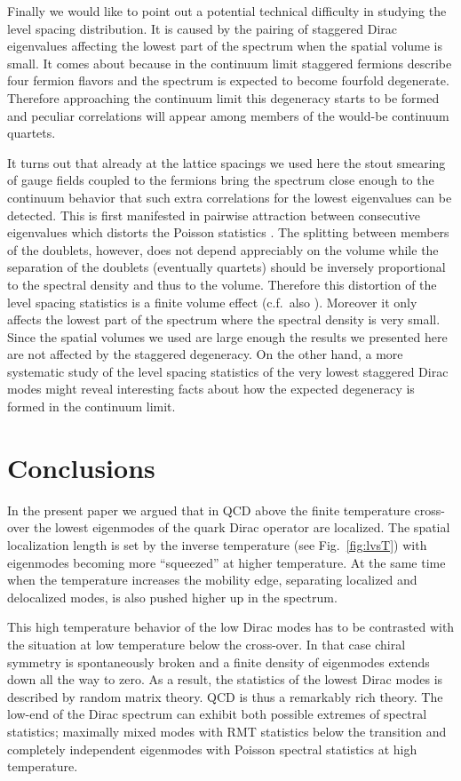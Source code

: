 \documentclass[twocolumn, prd, preprintnumbers, amsmath,
  amssymb, showpacs, floatfix]{revtex4-1}
\begin{document}
Finally we would like to point out a potential technical difficulty in
studying the level spacing distribution. It is caused by the pairing of
staggered Dirac eigenvalues affecting the lowest part of the spectrum when the
spatial volume is small. It comes about because in the continuum limit
staggered fermions describe four fermion flavors and the spectrum is expected
to become fourfold degenerate. Therefore approaching the continuum limit this
degeneracy starts to be formed and peculiar correlations will appear among
members of the would-be continuum quartets.

It turns out that already at the lattice spacings we used here the stout
smearing of gauge fields coupled to the fermions bring the spectrum close
enough to the continuum behavior that such extra correlations for the lowest
eigenvalues can be detected. This is first manifested in pairwise attraction
between consecutive eigenvalues which distorts the Poisson statistics
\cite{Kovacs:2011km}.  The splitting between members of the doublets, however,
does not depend appreciably on the volume while the separation of the doublets
(eventually quartets) should be inversely proportional to the spectral density
and thus to the volume. Therefore this distortion of the level spacing
statistics is a finite volume effect (c.f.\ also
\cite{Halasz:1996sb}). Moreover it only affects the lowest part of the
spectrum where the spectral density is very small. Since the spatial volumes
we used are large enough the results we presented here are not affected by the
staggered degeneracy. On the other hand, a more systematic study of the level
spacing statistics of the very lowest staggered Dirac modes might reveal
interesting facts about how the expected degeneracy is formed in the continuum
limit.


\section{Conclusions}
   \label{se:C}

In the present paper we argued that in QCD above the finite temperature
cross-over the lowest eigenmodes of the quark Dirac operator are
localized. The spatial localization length is set by the inverse temperature
(see Fig.~\ref{fig:lvsT}) with eigenmodes becoming more ``squeezed'' at
higher temperature. At the same time when the temperature increases the
mobility edge, separating localized and delocalized modes, is also pushed
higher up in the spectrum.

This high temperature behavior of the low Dirac modes has to be contrasted
with the situation at low temperature below the cross-over. In that case
chiral symmetry is spontaneously broken and a finite density of eigenmodes
extends down all the way to zero. As a result, the statistics of the lowest
Dirac modes is described by random matrix theory. QCD is thus a remarkably
rich theory. The low-end of the Dirac spectrum can exhibit both possible
extremes of spectral statistics; maximally mixed modes with RMT statistics
below the transition and completely independent eigenmodes with Poisson
spectral statistics at high temperature.
\end{document}

